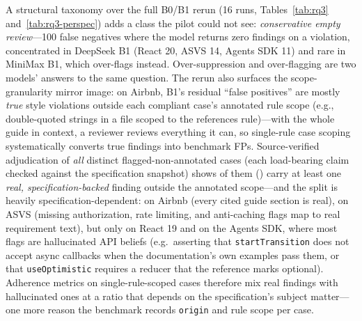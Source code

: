 \documentclass[11pt]{article}
\begin{document}
A structural taxonomy over the full B0/B1 rerun (16 runs,
Tables~\ref{tab:rq3} and~\ref{tab:rq3-perspec}) adds a class the pilot
could not see: \emph{conservative empty review}---100 false negatives where the
model returns zero findings on a violation, concentrated in DeepSeek B1
(React 20, ASVS 14, Agents SDK 11) and rare in MiniMax B1, which over-flags
instead. Over-suppression and over-flagging are two models' answers to the
same question. The rerun also surfaces the scope-granularity mirror image: on
Airbnb, B1's residual ``false positives'' are mostly \emph{true}
style violations outside each compliant case's annotated rule scope (e.g.,
double-quoted strings in a file scoped to the references rule)---with the whole
guide in context, a reviewer reviews everything it can, so single-rule case
scoping systematically converts true findings into benchmark FPs.
Source-verified adjudication of \emph{all} \taxFullN{} distinct
flagged-non-annotated cases (each load-bearing claim checked against the
specification snapshot) shows \taxFullTrue{} of them (\taxFullShare{}) carry at
least one \emph{real, specification-backed} finding outside the annotated
scope---and the split is heavily specification-dependent:
\taxFullAirbnb{} on Airbnb (every cited guide section is real),
\taxFullAsvs{} on ASVS (missing authorization, rate limiting, and
anti-caching flags map to real requirement text),
but only \taxFullReact{} on React 19 and \taxFullAgents{} on the Agents SDK,
where most flags are hallucinated API beliefs (e.g.\ asserting that
\texttt{startTransition} does not accept async callbacks when the
documentation's own examples pass them, or that \texttt{useOptimistic}
requires a reducer that the reference marks optional). Adherence metrics on
single-rule-scoped cases therefore mix real findings with hallucinated ones at
a ratio that depends on the specification's subject matter---one more reason
the benchmark records \texttt{origin} and rule scope per case.

\begin{table}[t]
\centering
\caption{Structural taxonomy over the full B0/B1 rerun (16 runs): per-class
FP/FN case counts aggregated by model and configuration. Only the two classes
that occur in B0/B1 runs are shown.}
\label{tab:rq3}

\end{table}

\begin{table}[t]
\centering
\caption{Conservative empty review (the structural FN class) by specification
and model: over-suppression concentrates in DeepSeek B1.}
\label{tab:rq3-perspec}

\end{table}
\end{document}
